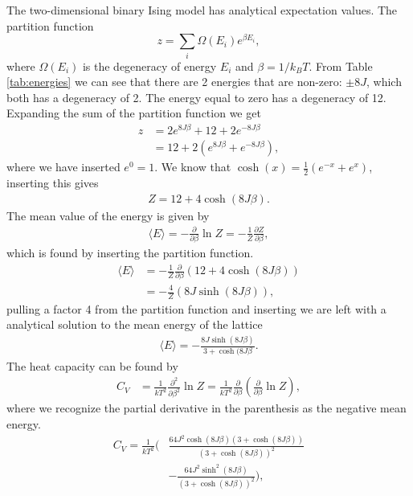 \documentclass{emulateapj}
\begin{document}
The two-dimensional binary Ising model has analytical expectation values. The partition function
%
\begin{equation*}
    z = \sum_i \Omega(E_i) e^{\beta E_i},
\end{equation*}
%
where $\Omega(E_i)$ is the degeneracy of energy $E_i$ and $\beta = 1/k_BT$. From Table \ref{tab:energies} we can see that there are 2 energies that are non-zero: $\pm 8J$, which both has a degeneracy of 2. The energy equal to zero has a degeneracy of 12. Expanding the sum of the partition function we get 
%
\begin{align*}
    z &= 2e^{8J\beta} + 12 + 2e^{-8J\beta} \\
    &= 12 + 2\left(e^{8J\beta} + e^{-8J\beta}\right),
\end{align*}
%
where we have inserted $e^0 = 1$. We know that $\cosh(x) = \frac{1}{2}\left( e^{-x} + e^x\right)$, inserting this gives
%
\begin{gather}\label{eq:z}
    Z = 12 + 4\cosh(8J\beta).
\end{gather}
%
The mean value of the energy is given by
%
\begin{align*}
    \langle E \rangle = -\frac{\partial }{\partial \beta} \ln Z = -\frac{1}{Z}\frac{\partial Z}{\partial \beta},
\end{align*}
%
which is found by inserting the partition function.
%
\begin{align*}
    \langle E \rangle &= -\frac{1}{Z}\frac{\partial}{\partial \beta} \left(12 + 4 \cosh\left(8J\beta\right)\right)\\
    &= -\frac{4}{Z}\left(8J\sinh\left(8J\beta\right)\right),
\end{align*}
pulling a factor 4 from the partition function and inserting we are left with a analytical solution to the mean energy of the lattice
%
\begin{gather*}
    \langle E \rangle = -\frac{8J\sinh\left(8J\beta\right)}{3 + \cosh(8J\beta}.
\end{gather*}
%
The heat capacity can be found by
%
\begin{align*}
    C_V &= \frac{1}{kT^2}\frac{\partial^2}{\partial \beta^2} \ln Z = \frac{1}{kT^2}\frac{\partial}{\partial \beta}\left(\frac{\partial}{\partial \beta} \ln Z\right),
\end{align*}
%
where we recognize the partial derivative in the parenthesis as the negative mean energy. 
%
\begin{align*}
    C_V = \frac{1}{kT^2}\bigg(&\frac{64J^2\cosh\left(8J\beta\right)\left(3 + \cosh\left(8J\beta\right)\right)}{\left(3 + \cosh\left(8J\beta\right)\right)^2} \\ &-\frac{64J^2\sinh^2\left(8J\beta\right)}{\left(3 + \cosh\left(8J\beta\right)\right)^2}\bigg),
\end{align*}
\end{document}
